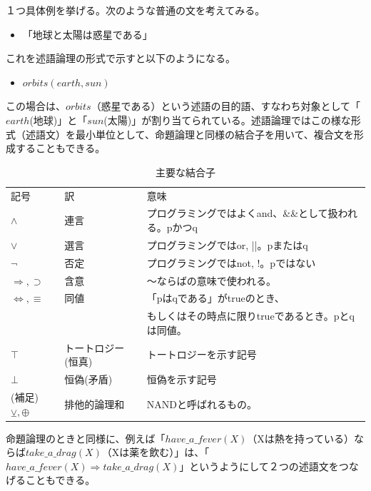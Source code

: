 \documentclass[dvipdfmx]{jsarticle}
\begin{document}
  １つ具体例を挙げる。次のような普通の文を考えてみる。
  \begin{itemize}
    \item 「地球と太陽は惑星である」
  \end{itemize}
  これを述語論理の形式で示すと以下のようになる。
  \begin{itemize}
    \item $orbits(earth, sun)$
  \end{itemize}
  この場合は、$orbits$（惑星である）という述語の目的語、すなわち対象として「$earth$(地球)」と「$sun$(太陽)」が割り当てられている。述語論理ではこの様な形式（述語文）を最小単位として、命題論理と同様の結合子を用いて、複合文を形成することもできる。
  \begin{table}[H]
    \centering
    \begin{tabular}{lll}
    記号                & 訳 & 意味\\
    $\wedge$          & 連言 & プログラミングではよくand、\&\&として扱われる。pかつq\\
    $\vee$            & 選言 & プログラミングではor, ||。pまたはq\\
    $\neg$            & 否定 & プログラミングではnot, !。pではない\\
    $\Rightarrow, \supset$     & 含意 &〜ならばの意味で使われる。\\
    $\Leftrightarrow, \equiv$ & 同値 &「pはqである」がtrueのとき、\\&&もしくはその時点に限りtrueであるとき。pとqは同値。\\
    $\top$ &トートロジー(恒真)&トートロジーを示す記号 \\
    $\bot$ &恒偽(矛盾)&恒偽を示す記号\\
    (補足)$\veebar, \oplus$ & 排他的論理和& NANDと呼ばれるもの。\\
    \end{tabular}
    \caption{主要な結合子}
\end{table}
命題論理のときと同様に、例えば「$have\_a\_fever(X)$（Xは熱を持っている）ならば$take\_a\_drag(X)$（Xは薬を飲む）」は、「$have\_a\_fever(X)\Rightarrow take\_a\_drag(X)$」というようにして２つの述語文をつなげることもできる。
\end{document}
